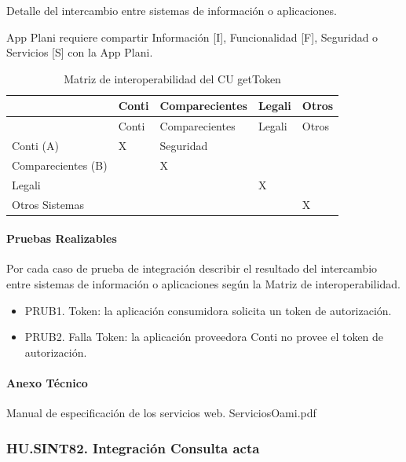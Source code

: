 \documentclass[
  paper=a4,
  ,captions=tableheading
]{scrartcl}
\providecommand{\tightlist}{%
  \setlength{\itemsep}{0pt}\setlength{\parskip}{0pt}}
\begin{document}
Detalle del intercambio entre sistemas de información o aplicaciones.

App Plani requiere compartir Información {[}I{]}, Funcionalidad {[}F{]},
Seguridad o Servicios {[}S{]} con la App Plani.

\begin{longtable}[]{@{}lllll@{}}
\caption{Matriz de interoperabilidad del CU getToken}\tabularnewline
\toprule\noalign{}
& Conti & Comparecientes & Legali & Otros \\
\midrule\noalign{}
\endfirsthead
\toprule\noalign{}
& Conti & Comparecientes & Legali & Otros \\
\midrule\noalign{}
\endhead
\bottomrule\noalign{}
\endlastfoot
Conti (A) & X & Seguridad & & \\
Comparecientes (B) & & X & & \\
Legali & & & X & \\
Otros Sistemas & & & & X \\
\end{longtable}

\paragraph{Pruebas Realizables}\label{sec:pruebas-realizables-1}

Por cada caso de prueba de integración describir el resultado del
intercambio entre sistemas de información o aplicaciones según la Matriz
de interoperabilidad.

\begin{itemize}
\tightlist
\item
  PRUB1. Token: la aplicación consumidora solicita un token de
  autorización.
\item
  PRUB2. Falla Token: la aplicación proveedora Conti no provee el token
  de autorización.
\end{itemize}

\paragraph{Anexo Técnico}\label{sec:anexo-tuxe9cnico-1}

Manual de especificación de los servicios web. ServiciosOami.pdf

\subsubsection{HU.SINT82. Integración Consulta
acta}\label{sec:hu.sint82.-integraciuxf3n-consulta-acta}
\end{document}
